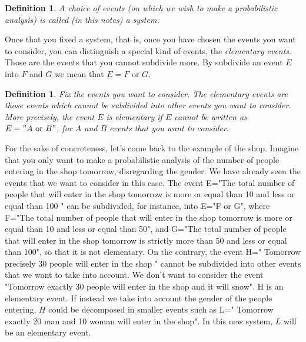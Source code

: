 \documentclass[12pt]{article}
\newtheorem{definition}[theorem]{Definition}
\newcommand{\<}{{\langle \!\! \langle}}
\renewcommand{\>}{{\rangle \!\! \rangle}}
\begin{document}
\begin{definition}
	A choice of events (on which we wish to make a probabilistic analysis) is called (in this notes) a system. 
\end{definition}

 Once that you fixed a system, that is, once you have chosen the events you want to consider, you can distinguish a special kind of events, the \emph{elementary events}. Those are the events that you cannot subdivide more. By subdivide an event $E$ into $F$ and $G$ we mean that $E= F \textrm{ or } G$.\\  

\begin{definition}
	Fix the events you want to consider. The elementary events are those events  which cannot be subdivided into other events you want to consider. More precisely, the event $E$ is elementary if $E$ cannot be written as $E= "A\textrm{ or } B"$, for $A$ and $B$ events that you want to consider.  
\end{definition}

For the sake of concreteness, let's come back to the example of the shop. Imagine that you only want to make a probabilistic analysis of  the number of people entering in the shop tomorrow, disregarding the gender. We have already seen the events that we want to consider in this case. The event E="The total number of people that will enter in the shop tomorrow is more or equal than 10 and less or equal than 100 " can be subdivided, for instance, into E="F or G", where 
F="The total number of people that will enter in the shop tomorrow is more or equal than 10 and less or equal than 50", and 
G="The total number of people that will enter in the shop tomorrow is strictly more than 50 and less or equal than 100", so that it is not elementary. On the contrary, the event H=" Tomorrow precisely 30 people will enter in the shop " cannot be subdivided into other events that we want to take into account. We don't want to consider the event "Tomorrow exactly 30 people will enter in the shop and it will snow". H is an elementary event. 
If instead we take into account the gender of the people entering, $H$ could be decomposed in smaller events such as L=" Tomorrow exactly 20 man and 10 woman will enter in the shop". In this new system, $L$ will be an elementary event. \\ 
\end{document}
